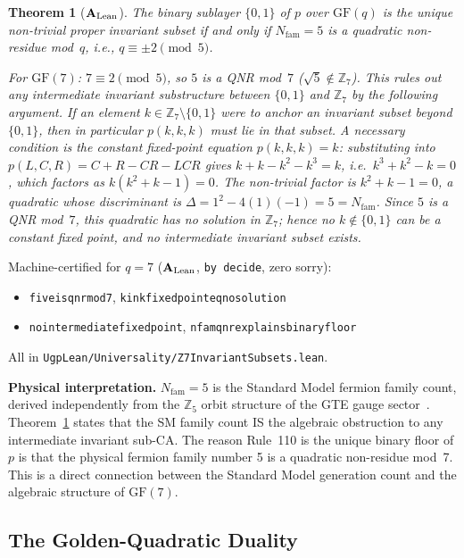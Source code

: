 \documentclass[11pt]{article}
\newtheorem{theorem}{Theorem}[section]
\theoremstyle{remark}
\newcommand{\ZS}{\ensuremath{\mathbb{Z}_7}}
\newcommand{\GF}[1]{\ensuremath{\mathrm{GF}(#1)}}
\newcommand{\lean}[1]{%
  \penalty-100
  \begingroup\def\_{\textunderscore\allowbreak}\texttt{#1}\endgroup}
\newcommand{\CatAL}{\texorpdfstring{\ensuremath{\textbf{A}_{\rm Lean}}}{A-Lean}}
\begin{document}
\begin{theorem}[\CatAL{}]
\label{thm:qnr}
The binary sublayer $\{0,1\}$ of $p$ over $\GF{q}$ is the unique non-trivial
proper invariant subset if and only if $N_{\mathrm{fam}} = 5$ is a quadratic
non-residue mod~$q$, i.e., $q \equiv \pm 2 \pmod{5}$.

For $\GF{7}$: $7 \equiv 2 \pmod{5}$, so $5$ is a QNR mod~$7$
($\sqrt{5} \notin \ZS$). This rules out any intermediate invariant
substructure between $\{0,1\}$ and $\ZS$ by the following argument. If an
element $k \in \ZS \setminus \{0,1\}$ were to anchor an invariant subset
beyond $\{0,1\}$, then in particular $p(k,k,k)$ must lie in that subset. A
necessary condition is the \emph{constant fixed-point equation}
$p(k,k,k) = k$: substituting into $p(L,C,R) = C+R-CR-LCR$ gives
$k + k - k^2 - k^3 = k$, i.e.\ $k^3 + k^2 - k = 0$, which factors as
$k(k^2 + k - 1) = 0$. The non-trivial factor is $k^2 + k - 1 = 0$, a
quadratic whose discriminant is $\Delta = 1^2 - 4(1)(-1) = 5 = N_{\mathrm{fam}}$.
Since $5$ is a QNR mod~$7$, this quadratic has no solution in $\ZS$; hence no
$k \notin \{0,1\}$ can be a constant fixed point, and no intermediate invariant
subset exists.
\end{theorem}

Machine-certified for $q = 7$ (\CatAL{}, \lean{by decide}, zero sorry):
\begin{itemize}[leftmargin=2.5em,itemsep=1pt,topsep=2pt]
  \item \lean{five\_is\_qnr\_mod7}, \lean{kink\_fixed\_point\_eq\_no\_solution}
  \item \lean{no\_intermediate\_fixed\_point}, \lean{nfam\_qnr\_explains\_binary\_floor}
\end{itemize}
All in \lean{UgpLean/Universality/Z7InvariantSubsets.lean}.

\medskip
\noindent\textbf{Physical interpretation.}
$N_{\mathrm{fam}} = 5$ is the Standard Model fermion family count, derived
independently from the $\mathbb{Z}_5$ orbit structure of the GTE gauge
sector~\cite{SpivackCompUniversality,SpivackCMCA}. Theorem~\ref{thm:qnr} states
that the SM family count IS the algebraic obstruction to any intermediate
invariant sub-CA. The reason Rule~110 is the unique binary floor of $p$ is
that the physical fermion family number 5 is a quadratic non-residue mod~7.
This is a direct connection between the Standard Model generation count and
the algebraic structure of $\GF{7}$.

\subsection{The Golden-Quadratic Duality}
\label{subsec:golden-duality}
\end{document}
